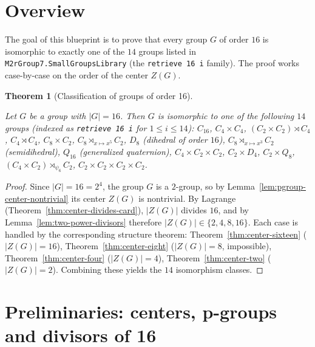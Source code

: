 \documentclass{article}
\newtheorem{theorem}{Theorem}[section]
\theoremstyle{definition}
\newcommand{\uses}[1]{}
\begin{document}
\section{Overview}

The goal of this blueprint is to prove that every group $G$ of order $16$ is
isomorphic to exactly one of the $14$ groups listed in
\texttt{M2rGroup7.SmallGroupsLibrary} (the \texttt{retrieve 16 i} family).
The proof works case-by-case on the order of the center $Z(G)$.

\begin{theorem}[Classification of groups of order 16]
    \label{thm:sixteen-classification}
    \uses{thm:center-sixteen,thm:center-eight,thm:center-four,thm:center-two,
          thm:center-divides-card,lem:pgroup-center-nontrivial}
    Let $G$ be a group with $|G| = 16$. Then $G$ is isomorphic to one of the
    following $14$ groups (indexed as \texttt{retrieve 16 i} for
    $1 \le i \le 14$):
    $C_{16}$, $C_4 \times C_4$, $(C_2 \times C_2) \rtimes C_4$,
    $C_4 \rtimes C_4$, $C_8 \times C_2$, $C_8 \rtimes_{x \mapsto x^5} C_2$,
    $D_8$ (dihedral of order $16$), $C_8 \rtimes_{x \mapsto x^3} C_2$
    (semidihedral), $Q_{16}$ (generalized quaternion),
    $C_4 \times C_2 \times C_2$, $C_2 \times D_4$, $C_2 \times Q_8$,
    $(C_4 \times C_2) \rtimes_{\psi_6} C_2$,
    $C_2 \times C_2 \times C_2 \times C_2$.
\end{theorem}
\begin{proof}
    \uses{thm:center-sixteen,thm:center-eight,thm:center-four,thm:center-two,
          thm:center-divides-card,lem:pgroup-center-nontrivial,lem:two-power-divisors}
    Since $|G| = 16 = 2^4$, the group $G$ is a $2$-group, so by
    Lemma~\ref{lem:pgroup-center-nontrivial} its center $Z(G)$ is nontrivial.
    By Lagrange (Theorem~\ref{thm:center-divides-card}), $|Z(G)|$ divides
    $16$, and by Lemma~\ref{lem:two-power-divisors} therefore
    $|Z(G)| \in \{2, 4, 8, 16\}$. Each case is handled by the corresponding
    structure theorem:
    Theorem~\ref{thm:center-sixteen} ($|Z(G)| = 16$),
    Theorem~\ref{thm:center-eight} ($|Z(G)| = 8$, impossible),
    Theorem~\ref{thm:center-four} ($|Z(G)| = 4$),
    Theorem~\ref{thm:center-two} ($|Z(G)| = 2$).
    Combining these yields the $14$ isomorphism classes.
\end{proof}

\section{Preliminaries: centers, p-groups and divisors of 16}
\end{document}
